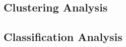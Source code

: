 
    \subsection{Clustering Analysis}\label{subsec:clustering-analysis}

    \subsection{Classification Analysis}\label{subsec:classification-analysis}
